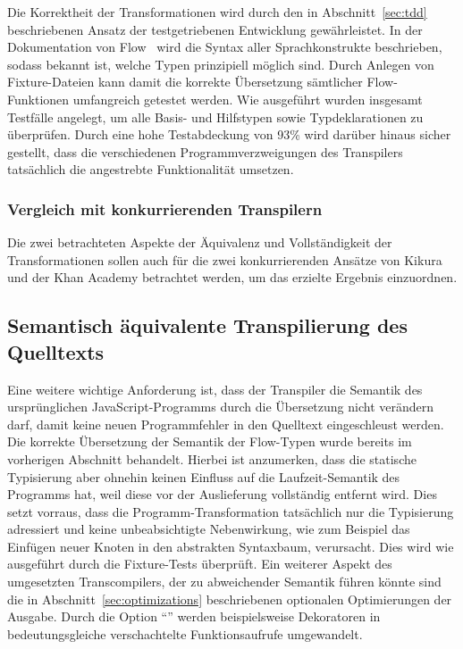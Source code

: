 Die Korrektheit der Transformationen wird durch den in Abschnitt~\ref{sec:tdd} beschriebenen Ansatz der testgetriebenen Entwicklung gewährleistet. In der Dokumentation von Flow~\autocite{FLOW:TYPE_ANNOTATIONS} wird die Syntax aller Sprachkonstrukte beschrieben, sodass bekannt ist, welche Typen prinzipiell möglich sind. Durch Anlegen von Fixture-Dateien kann damit die korrekte Übersetzung sämtlicher Flow-Funktionen umfangreich getestet werden. Wie ausgeführt wurden insgesamt \numberOfTests Testfälle angelegt, um alle Basis- und Hilfstypen sowie Typdeklarationen zu überprüfen. Durch eine hohe Testabdeckung von 93\% wird darüber hinaus sicher gestellt, dass die verschiedenen Programmverzweigungen des Transpilers tatsächlich die angestrebte Funktionalität umsetzen.


\subsubsection{Vergleich mit konkurrierenden Transpilern}

Die zwei betrachteten Aspekte der Äquivalenz und Vollständigkeit der Transformationen sollen auch für die zwei konkurrierenden Ansätze von Kikura und der Khan Academy betrachtet werden, um das erzielte Ergebnis einzuordnen.



\subsection{Semantisch äquivalente Transpilierung des Quelltexts}

Eine weitere wichtige Anforderung ist, dass der Transpiler die Semantik des ursprünglichen JavaScript-Programms durch die Übersetzung nicht verändern darf, damit keine neuen Programmfehler in den Quelltext eingeschleust werden. Die korrekte Übersetzung der Semantik der Flow-Typen wurde bereits im vorherigen Abschnitt behandelt. Hierbei ist anzumerken, dass die statische Typisierung aber ohnehin keinen Einfluss auf die Laufzeit-Semantik des Programms hat, weil diese vor der Auslieferung vollständig entfernt wird. Dies setzt vorraus, dass die Programm-Transformation tatsächlich nur die Typisierung adressiert und keine unbeabsichtigte Nebenwirkung, wie zum Beispiel das Einfügen neuer Knoten in den abstrakten Syntaxbaum, verursacht. Dies wird wie ausgeführt durch die Fixture-Tests überprüft. Ein weiterer Aspekt des umgesetzten Transcompilers, der zu abweichender Semantik führen könnte sind die in Abschnitt~\ref{sec:optimizations} beschriebenen optionalen Optimierungen der Ausgabe. Durch die Option \enquote{} werden beispielsweise Dekoratoren in bedeutungsgleiche verschachtelte Funktionsaufrufe umgewandelt.

